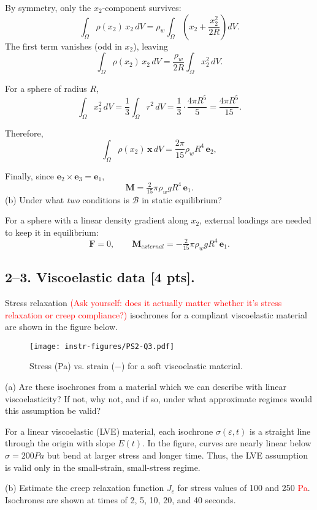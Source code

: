 By symmetry, only the $x_2$-component survives:
$$
\int_\Omega \rho(x_2)\,x_2\,dV 
= \rho_w \int_\Omega \left( x_2 + \frac{x_2^2}{2R} \right) dV.
$$
The first term vanishes (odd in $x_2$), leaving
$$
\int_\Omega \rho(x_2)\,x_2\,dV 
= \frac{\rho_w}{2R}\int_\Omega x_2^2 \, dV.
$$

For a sphere of radius $R$,
$$
\int_\Omega x_2^2 \, dV 
= \frac{1}{3}\int_\Omega r^2 \, dV 
= \frac{1}{3}\cdot \frac{4\pi R^5}{5} 
= \frac{4\pi R^5}{15}.
$$

Therefore,
$$
\int_\Omega \rho(x_2)\,\bm x\,dV = \frac{2\pi}{15}\rho_w R^4\,\bm e_2,
$$

Finally, since $\bm e_2 \times \bm e_3 = \bm e_1$,
$$
\bm M = \tfrac{2}{15}\pi \rho_w g R^4 \,\bm e_1.
$$
\medskip
(b) Under what \textit{two} conditions is $\mathcal{B}$ in static equilibrium?

For a sphere with a linear density gradient along $x_2$, external loadings are needed to keep it in equilibrium:
$$
\bm F = 0, \qquad \bm M_{external} = -\tfrac{2}{15}\pi \rho_w g R^4 \,\bm e_1.
$$

\bigskip
\subsection*{2--3. \textbf{Viscoelastic data} [4 pts].} 
Stress relaxation \textcolor{red}{(Ask yourself: does it actually matter whether it's stress relaxation or creep compliance?)} isochrones for a compliant viscoelastic material are shown in the figure below.  

\begin{figure}[H]
\vspace{-1em}
\centering
\texttt{[image: instr-figures/PS2-Q3.pdf]}
\caption{\small{Stress (Pa) vs. strain ($-$) for a soft viscoelastic material.}}
\end{figure}

\vspace{-1em}
(a) Are these isochrones from a material which we can describe with linear viscoelasticity? If not, why not, and if so, under what approximate regimes would this assumption be valid? 

For a linear viscoelastic (LVE) material, each isochrone $\sigma(\varepsilon,t)$ is a straight line through the origin with slope $E(t)$. 
In the figure, curves are nearly linear below $\sigma = 200 Pa$ but bend at larger stress and longer time. 
Thus, the LVE assumption is valid only in the small-strain, small-stress regime.

\medskip
(b) Estimate the creep relaxation function $J_c$ for stress values of 100 and 250 \textcolor{red}{Pa}. Isochrones are shown at times of 2, 5, 10, 20, and 40 seconds.   

